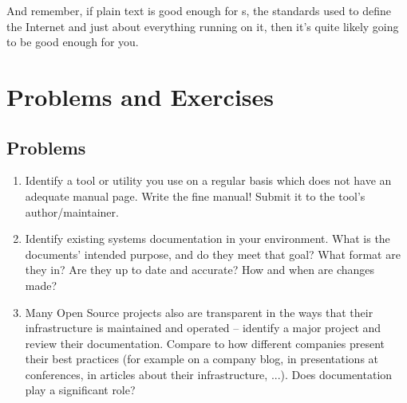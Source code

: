 And remember, if plain text is good enough for
s, the standards used to define the
Internet and just about everything running on it, then
it's quite likely going to be good enough for you.

\vfill
\pagebreak

\chapter*{Problems and Exercises}
\section*{Problems}

\begin{enumerate}
\item
Identify a tool or utility you use on a regular basis which does not have
an adequate manual page.  Write the fine manual!  Submit it to the tool's
author/maintainer.

\item
Identify existing systems documentation in your environment.  What is the
documents' intended purpose, and do they meet that goal?  What format are
they in?  Are they up to date and accurate?  How and when are changes
made?

\item
Many Open Source projects also are transparent in the ways that their
infrastructure is maintained and operated -- identify a major project and
review their documentation.  Compare to how different companies present
their best practices (for example on a company blog, in presentations at
conferences, in articles about their infrastructure, ...).  Does
documentation play a significant role?

\end{enumerate}

\pagebreak

